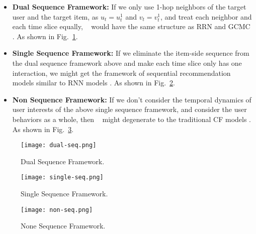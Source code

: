 \begin{itemize}[leftmargin=15pt]
	\item \textbf{Dual Sequence Framework:} If we only use 1-hop neighbors of the target user and the target item, as $u_t = u_t^1$ and $v_t = v_t^1$, and treat each neighbor and each time slice equally, \score~ would have the same structure as RRN \cite{wu2017recurrent} and GCMC \cite{fadel2018link}. As shown in Fig.~\ref{fig:dual-seq}.
	\item \textbf{Single Sequence Framework:} If we eliminate the item-side sequence from the dual sequence framework above and make each time slice only has one interaction, we might get the framework of sequential recommendation models similar to RNN models \cite{hidasi2015session,ren2019lifelong,zhou2018deepb}. As shown in Fig.~\ref{fig:single-seq}.
	\item \textbf{Non Sequence Framework:} If we don't consider the temporal dynamics of user interests of the above single sequence framework, and consider the user behaviors as a whole, then \score~ might degenerate to the traditional CF models \cite{koren2008factorization}. As shown in Fig.~\ref{fig:non-seq}.
\end{itemize}

\begin{figure}[t]
	\centering
	\texttt{[image: dual-seq.png]}
	\caption{Dual Sequence Framework.}
	\label{fig:dual-seq}
	\vspace{-10pt}
\end{figure}

\begin{figure}[t]
	\centering
	\texttt{[image: single-seq.png]}
	\caption{Single Sequence Framework.}
	\label{fig:single-seq}
	\vspace{-10pt}
\end{figure}

\begin{figure}[t]
	\centering
	\texttt{[image: non-seq.png]}
	\caption{None Sequence Framework.}
	\label{fig:non-seq}
	\vspace{-10pt}
\end{figure}
